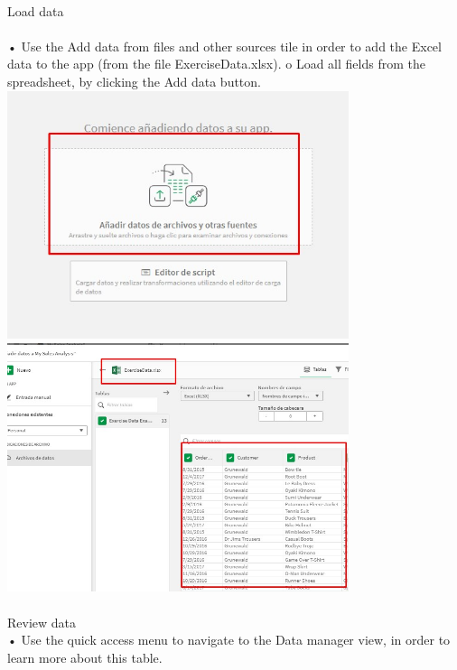 \documentclass[preprint,12pt]{elsarticle}
\begin{document}
\begin{itemize}
		 		 \\Load data  \\
		 		\\• Use the Add data from files and other sources tile in order to add the
		 		Excel data to the app (from the file ExerciseData.xlsx).
		 		o Load all fields from the spreadsheet, by clicking the Add data
		 		button. \\
		 		 \includegraphics[width=10cm]{./IMAGENES/1.3} \\
		 		 \includegraphics[width=10cm]{./IMAGENES/1.3.2} \\
		 		\\Review data
		 		\\• Use the quick access menu to navigate to the Data manager view, in
		 		order to learn more about this table.
		 		

\end{itemize}
\end{document}
